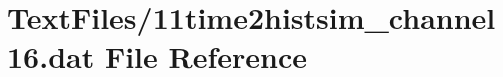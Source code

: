 \hypertarget{11time2histsim__channel16_8dat}{}\section{Text\+Files/11time2histsim\+\_\+channel16.dat File Reference}
\label{11time2histsim__channel16_8dat}
